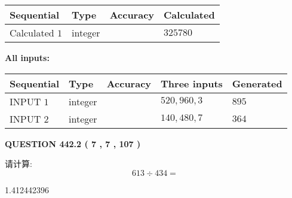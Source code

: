 \documentclass{ctexart}
\begin{document}
   
   
   
\noindent{}
   
   
  
  
\noindent\begin{tabular}{|l|l|l|l|}
\hline
 Sequential & Type & Accuracy & Calculated \\ 
\hline
 
 
  Calculated $  1 $ & integer &  & 
  $ 325780 $ 
 \\  \hline  
 \end{tabular}
   
   
   
   
\noindent\vspace{0.1in}\hspace{-0.08in} {\textbf{\Large{All inputs: }}}
   
   
  
  
\noindent\begin{tabular}{|l|l|l|l|l|}
\hline
 Sequential & Type & Accuracy & Three inputs & Generated \\ 
\hline
 
 
  INPUT $  1 $ & integer &  & $
 520
 , 
 960
 , 
 3
 $ & $ 895 $ 
 \\  \hline  
 
 
  INPUT $  2 $ & integer &  & $
 140
 , 
 480
 , 
 7
 $ & $ 364 $ 
 \\  \hline  
 \end{tabular}
   
   
  
\vspace{0.2in}
  
{\textbf{\Large{QUESTION
442.2 
 ( 7 , 7 , 107 )
}}}
  
  
 
请计算:
\begin{equation}
613  \div    %
434 = \nonumber
\end{equation}
 
 
 
\noindent{}
 
 

1.412442396
 
 
\noindent{}
 
 

 
 
 
\noindent{}
 
\end{document}

